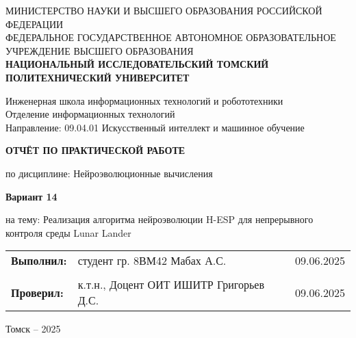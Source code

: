 \documentclass[a4paper,12pt]{article}
\begin{document}
\begin{titlepage}
	\vspace*{1cm}
	{\small
		\begin{center}
			МИНИСТЕРСТВО НАУКИ И ВЫСШЕГО ОБРАЗОВАНИЯ РОССИЙСКОЙ ФЕДЕРАЦИИ\\
			ФЕДЕРАЛЬНОЕ ГОСУДАРСТВЕННОЕ АВТОНОМНОЕ ОБРАЗОВАТЕЛЬНОЕ УЧРЕЖДЕНИЕ ВЫСШЕГО ОБРАЗОВАНИЯ\\
			\textbf{НАЦИОНАЛЬНЫЙ ИССЛЕДОВАТЕЛЬСКИЙ ТОМСКИЙ ПОЛИТЕХНИЧЕСКИЙ УНИВЕРСИТЕТ}
		\end{center}
	}
	\vspace{0.5cm}
	\begin{center}
		Инженерная школа информационных технологий и робототехники\\
		Отделение информационных технологий\\
		Направление: 09.04.01 Искусственный интеллект и машинное обучение
	\end{center}
	\vspace{1cm}
	\begin{center}
		\textbf{ОТЧЁТ ПО ПРАКТИЧЕСКОЙ РАБОТЕ}
	\end{center}
	\begin{center}
		по дисциплине: Нейроэволюционные вычисления
	\end{center}
	\vspace{0.5cm}
	\begin{center}
		\textbf{Вариант 14}
	\end{center}
	\begin{center}
		на тему: Реализация алгоритма нейроэволюции H-ESP для непрерывного контроля среды Lunar Lander
	\end{center}
	\vspace{1cm}
	
	\begin{tabular}{p{} p{} p{}}
		\textbf{Выполнил:} & студент гр. 8ВМ42 \newline Мабах А.С. & 09.06.2025 \\
		& & \\
		\textbf{Проверил:} & к.т.н., Доцент ОИТ ИШИТР \newline Григорьев Д.С. & 09.06.2025
	\end{tabular}
	\vfill
	\begin{center}
		Томск – 2025
	\end{center}
\end{titlepage}
\end{document}
